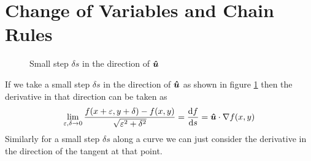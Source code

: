 \documentclass{article}
\renewcommand{\grad}{\nabla}
\begin{document}
    \section{Change of Variables and Chain Rules}
    \begin{figure}[ht]
        \centering
        \caption{Small step \(\delta s\) in the direction of \(\bm{\hat{u}}\)}
        \label{fig:small step delta s}
    \end{figure}
    If we take a small step \(\delta s\) in the direction of \(\bm{\hat{u}}\) as shown in figure \ref{fig:small step delta s} then the derivative in that direction can be taken as
    \[\lim_{\varepsilon, \delta\to 0}\frac{f(x + \varepsilon, y + \delta) - f(x, y)}{\sqrt{\varepsilon^2 + \delta^2}} = \dv{f}{s} = \vh u\cdot \grad f(x, y)\]
    Similarly for a small step \(\delta s\) along a curve we can just consider the derivative in the direction of the tangent at that point.
    
\end{document}
